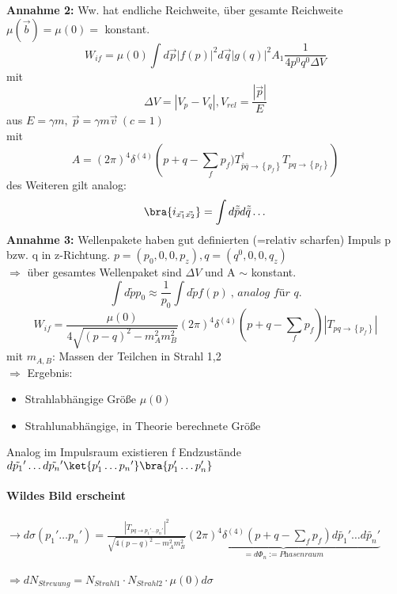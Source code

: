 \textbf{Annahme 2:} Ww. hat endliche Reichweite, über gesamte Reichweite $\mu 
(\vec{b}) = \mu (0) = $ konstant. \\
\[ W_{if} = \mu(0) \int d\vec{p} {\left| f(p) \right|}^2 d\vec{q} {\left| g(q) 
\right|}^2 A_1 \frac{1}{4p^0 q^0 \Delta V} \]
mit \[ \Delta V = \left| V_p - V_q \right|, V_{rel} = \frac{\left| \vec{p} 
\right|}{E}\] 
aus $E= \gamma m ,\ \vec{p} = \gamma m \vec{v}\ (c=1)$ \\
mit \[ A = {(2\pi)}^4 \delta^{(4)} \left(p+q - \sum_f p_f) 
T^{\dagger}_{\bar{p}\bar{q} \to \left\lbrace p_f \right\rbrace} T_{pq \to 
\left\lbrace p_f \right\rbrace} \right)\] 
des Weiteren gilt analog: 
\[ \bra{i_{\vec{x_1} \vec{x_2}}} = \int d\tilde{\bar{p}} d\tilde{\bar{q}} 
\dotsc \] 
\textbf{Annahme 3:} Wellenpakete haben gut definierten (=relativ scharfen) 
Impuls p bzw. q in z-Richtung. $p= \left( p_0, 0, 0, p_z \right), q = \left( 
q^0, 0, 0, q_z \right)$ \\
$\Rightarrow$ über gesamtes Wellenpaket sind $\Delta V$ und A $\sim$ konstant. 
\\
\[ \int d\tilde{p} p_0 \approx \frac{1}{p_0} \int d\tilde{p} f(p)\ \textit{, 
analog für q.} \] 
\[ W_{if} = \frac{\mu(0)}{4 \sqrt{{(p-q)}^2 - m_A^2 m_B^2}} {(2 \pi)}^4 
\delta^{(4)} (p+q - \sum_f{p_f}) \left| T_{pq \to \left\lbrace p_f 
\right\rbrace} \right| \]
mit $m_{A,B}$: Massen der Teilchen in Strahl 1,2 \\
$\Rightarrow$ Ergebnis: 
\begin{itemize}
\item Strahlabhängige Größe $\mu(0)$ 
\item Strahlunabhängige, in Theorie berechnete Größe 
\end{itemize} 
Analog im Impulsraum existieren f Endzustände $d\tilde{p_1}' \dotsc 
d\tilde{p_n}' \ket{p_1' \dotsc {p_n}'} \bra{p_1' \dotsc p_n'}$ \\
\\
\textbf{Wildes Bild erscheint}\\
\\
$\rightarrow d\sigma (p_1' \dotsc p_n') = \frac{{\left| T_{pq \to p_1' \dotsc 
p_n'} \right| }^2 }{\sqrt{4 {(p-q)}^2 - m_A^2 m_B^2}} \underbrace{{(2 \pi)}^4 
\delta^{(4)} (p+q - \sum_f{p_f}) d\tilde{p_1}' \dotsc d\tilde{p_n}'}_{=d\Phi_n 
:= \textit{Phasenraum}} $ \\
\\
$\Rightarrow dN_{Streuung} = N_{Strahl1} \cdot N_{Strahl2} \cdot \mu(0) 
d\sigma$ \\
\\
